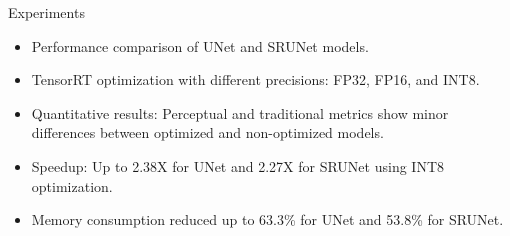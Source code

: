 \documentclass{beamer}
\begin{document}
\begin{frame}{Experiments}
\begin{itemize}
  \item Performance comparison of UNet and SRUNet models.
  \item TensorRT optimization with different precisions: FP32, FP16, and INT8.
  \item Quantitative results: Perceptual and traditional metrics show minor differences between optimized and non-optimized models.
  \item Speedup: Up to 2.38X for UNet and 2.27X for SRUNet using INT8 optimization.
  \item Memory consumption reduced up to 63.3\% for UNet and 53.8\% for SRUNet.
\end{itemize}
\end{frame}

\end{document}
